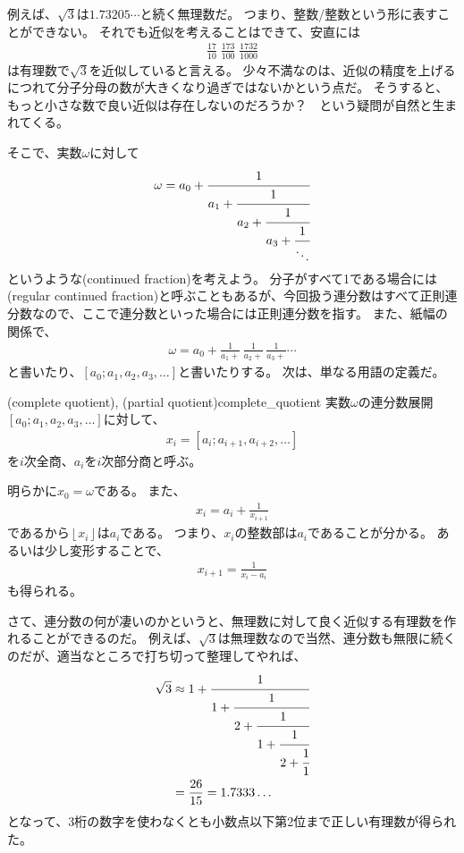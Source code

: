 例えば、$\sqrt{3}$は$1.73205\cdots$と続く無理数だ。
つまり、整数/整数という形に表すことができない。
それでも近似を考えることはできて、安直には
\begin{align*}
\frac{17}{10} \; \frac{173}{100} \; \frac{1732}{1000}
\end{align*}
は有理数で$\sqrt{3}$を近似していると言える。
少々不満なのは、近似の精度を上げるにつれて分子分母の数が大きくなり過ぎではないかという点だ。
そうすると、もっと小さな数で良い近似は存在しないのだろうか？　という疑問が自然と生まれてくる。

そこで、実数$\omega$に対して
\begin{align*}
\omega = a_0 + \cfrac{1}{a_1 + \cfrac{1}{a_2 + \cfrac{1}{a_3 + \cfrac{1}{\ddots}}}}
\end{align*}
というような(continued fraction)を考えよう。
分子がすべて1である場合には(regular continued fraction)と呼ぶこともあるが、今回扱う連分数はすべて正則連分数なので、ここで連分数といった場合には正則連分数を指す。
また、紙幅の関係で、
\begin{align*}
\omega=a_0 +\frac{1}{a_1 +}\, \frac{1}{a_2 +}\, \frac{1}{a_3 +}\cdots
\end{align*}
と書いたり、$[a_0;a_1,a_2,a_3,\ldots]$と書いたりする。
次は、単なる用語の定義だ。

\begin{Defi}{(complete quotient), (partial quotient)}{complete_quotient}
実数$\omega$の連分数展開$[a_0;a_1,a_2,a_3,\ldots]$に対して、
\begin{align*}
x_i = [a_i; a_{i+1}, a_{i+2},\ldots]
\end{align*}
を$i$次全商、$a_i$を$i$次部分商と呼ぶ。
\end{Defi}

明らかに$x_0=\omega$である。
また、
\begin{align*}
x_i = a_i + \frac{1}{x_{i+1}}
\end{align*}
であるから$\left\lfloor x_i \right\rfloor$は$a_i$である。
つまり、$x_i$の整数部は$a_i$であることが分かる。
あるいは少し変形することで、
\begin{align*}
x_{i+1} = \frac{1}{x_i - a_i}
\end{align*}
も得られる。

さて、連分数の何が凄いのかというと、無理数に対して良く近似する有理数を作れることができるのだ。
例えば、$\sqrt{3}$は無理数なので当然、連分数も無限に続くのだが、適当なところで打ち切って整理してやれば、
\begin{align*}
\sqrt{3} &\approx 1 + \cfrac{1}{1 + \cfrac{1}{2 + \cfrac{1}{1 + \cfrac{1}{2 + \cfrac{1}{1}}}}}\\
&=\frac{26}{15} = 1.7333\ldots
\end{align*}
となって、3桁の数字を使わなくとも小数点以下第2位まで正しい有理数が得られた。

